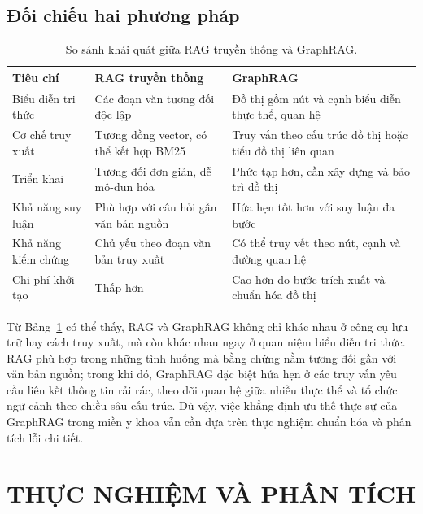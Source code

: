 \documentclass[a4paper,12pt,twoside]{report}
\begin{document}
\section{Đối chiếu hai phương pháp}
\begin{table}[H]
  \centering
  \caption{So sánh khái quát giữa RAG truyền thống và GraphRAG.}
  \label{tab:compare}
  \begin{tabular}{@{}p{3.2cm}p{5.5cm}p{5.5cm}@{}}
    \toprule
    \textbf{Tiêu chí} & \textbf{RAG truyền thống} & \textbf{GraphRAG} \\
    \midrule
    Biểu diễn tri thức & Các đoạn văn tương đối độc lập & Đồ thị gồm nút và cạnh biểu diễn thực thể, quan hệ \\
    Cơ chế truy xuất & Tương đồng vector, có thể kết hợp BM25 & Truy vấn theo cấu trúc đồ thị hoặc tiểu đồ thị liên quan \\
    Triển khai & Tương đối đơn giản, dễ mô-đun hóa & Phức tạp hơn, cần xây dựng và bảo trì đồ thị \\
    Khả năng suy luận & Phù hợp với câu hỏi gần văn bản nguồn & Hứa hẹn tốt hơn với suy luận đa bước \\
    Khả năng kiểm chứng & Chủ yếu theo đoạn văn bản truy xuất & Có thể truy vết theo nút, cạnh và đường quan hệ \\
    Chi phí khởi tạo & Thấp hơn & Cao hơn do bước trích xuất và chuẩn hóa đồ thị \\
    \bottomrule
  \end{tabular}
\end{table}

Từ Bảng~\ref{tab:compare} có thể thấy, RAG và GraphRAG không chỉ khác nhau ở công cụ lưu trữ hay cách truy xuất, mà còn khác nhau ngay ở quan niệm biểu diễn tri thức. RAG phù hợp trong những tình huống mà bằng chứng nằm tương đối gần với văn bản nguồn; trong khi đó, GraphRAG đặc biệt hứa hẹn ở các truy vấn yêu cầu liên kết thông tin rải rác, theo dõi quan hệ giữa nhiều thực thể và tổ chức ngữ cảnh theo chiều sâu cấu trúc. Dù vậy, việc khẳng định ưu thế thực sự của GraphRAG trong miền y khoa vẫn cần dựa trên thực nghiệm chuẩn hóa và phân tích lỗi chi tiết.

\chapter{THỰC NGHIỆM VÀ PHÂN TÍCH}
\label{chap:exp}
\end{document}
